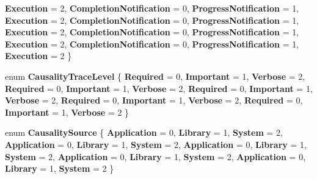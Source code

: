 \begin{DoxyCompactItemize}
{\bfseries Execution} = 2, 
{\bfseries Completion\+Notification} = 0, 
\newline
{\bfseries Progress\+Notification} = 1, 
{\bfseries Execution} = 2, 
{\bfseries Completion\+Notification} = 0, 
{\bfseries Progress\+Notification} = 1, 
\newline
{\bfseries Execution} = 2, 
{\bfseries Completion\+Notification} = 0, 
{\bfseries Progress\+Notification} = 1, 
{\bfseries Execution} = 2, 
\newline
{\bfseries Completion\+Notification} = 0, 
{\bfseries Progress\+Notification} = 1, 
{\bfseries Execution} = 2
 \}
\item 
\mbox{\label{namespace_windows_1_1_foundation_1_1_diagnostics_aa82022f66e6c5b053464b95c6479f156}} 
enum {\bfseries Causality\+Trace\+Level} \{ \newline
{\bfseries Required} = 0, 
{\bfseries Important} = 1, 
{\bfseries Verbose} = 2, 
{\bfseries Required} = 0, 
\newline
{\bfseries Important} = 1, 
{\bfseries Verbose} = 2, 
{\bfseries Required} = 0, 
{\bfseries Important} = 1, 
\newline
{\bfseries Verbose} = 2, 
{\bfseries Required} = 0, 
{\bfseries Important} = 1, 
{\bfseries Verbose} = 2, 
\newline
{\bfseries Required} = 0, 
{\bfseries Important} = 1, 
{\bfseries Verbose} = 2
 \}
\item 
\mbox{\label{namespace_windows_1_1_foundation_1_1_diagnostics_a3a370b356cb758e027ffea6414919c72}} 
enum {\bfseries Causality\+Source} \{ \newline
{\bfseries Application} = 0, 
{\bfseries Library} = 1, 
{\bfseries System} = 2, 
{\bfseries Application} = 0, 
\newline
{\bfseries Library} = 1, 
{\bfseries System} = 2, 
{\bfseries Application} = 0, 
{\bfseries Library} = 1, 
\newline
{\bfseries System} = 2, 
{\bfseries Application} = 0, 
{\bfseries Library} = 1, 
{\bfseries System} = 2, 
\newline
{\bfseries Application} = 0, 
{\bfseries Library} = 1, 
{\bfseries System} = 2
 \}
\item 
\mbox{\label{namespace_windows_1_1_foundation_1_1_diagnostics_a45d3c9f2fddbec91a3035d3e79a246c8}} 

\end{DoxyCompactItemize}
